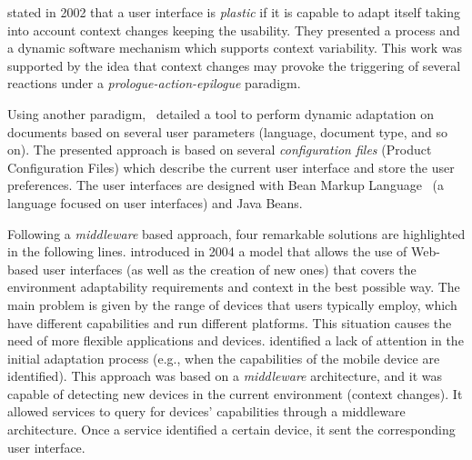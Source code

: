 \citet{calvary_plasticity_2002} stated in 2002 that a user interface is \textit{plastic}
if it is capable to adapt itself taking into account context changes keeping
the usability. They presented a process and a dynamic software mechanism which
supports context variability. This work was supported by the idea that context
changes may provoke the triggering of several reactions under a \textit{prologue-action-epilogue}
paradigm. 

Using another paradigm,~\citet{lehtonen_dynamic_2002} detailed a tool to perform
dynamic adaptation on documents based on several user parameters (language,
document type, and so on). The presented approach is based on several \textit{configuration
files} (Product Configuration Files) which describe the current user interface and
store the user preferences. The user interfaces are designed with Bean Markup
Language~\citep{weerawarana_bean_2001} (a language focused on user interfaces)
and Java Beans.

Following a \textit{middleware} based approach, four remarkable solutions are
highlighted in the following lines. \citet{repo_facilitating_2004} introduced in 
2004 a model that allows the use of Web-based user interfaces (as well as the 
creation of new ones) that covers the environment adaptability requirements and 
context in the best possible way. The main problem is given by the range of 
devices that users typically employ, which have different capabilities and run 
different platforms. This situation causes the need of more flexible applications 
and devices. \citeauthor{repo_facilitating_2004} identified a lack of attention in the initial adaptation process 
(e.g., when the capabilities of the mobile device are identified). This approach 
was based on a \textit{middleware} architecture, and it was capable of detecting 
new devices in the current environment (context changes). It allowed services to 
query for devices' capabilities through a middleware architecture. Once a service 
identified a certain device, it sent the corresponding user interface. 

